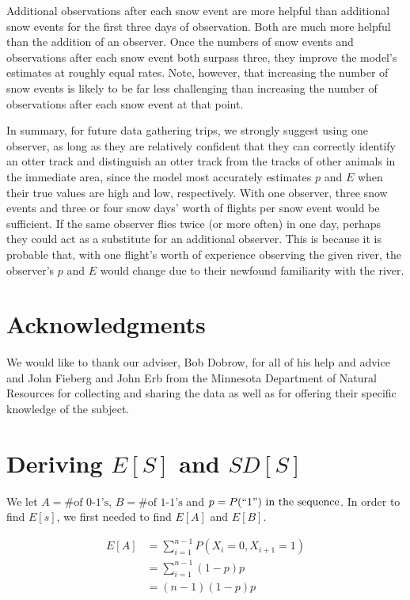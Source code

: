 \documentclass[12pt]{article}
\begin{document}
    Additional observations after each snow event are more helpful than
    additional snow events for the first three days of observation.
    Both are much more helpful than the addition of an observer.
    Once the numbers of snow events and observations after each snow event both
    surpass three, they improve the model's estimates at roughly equal rates.
    Note, however, that increasing the number of snow events is likely to be far
    less challenging than increasing the number of observations after each snow
    event at that point.

    In summary, for future data gathering trips, we strongly suggest using one
    observer, as long as they are relatively confident that they can correctly
    identify an otter track and distinguish an otter track from the tracks of
    other animals in the immediate area, since the model most accurately
    estimates \(p\) and \(E\) when their true values are high and low,
    respectively. With one observer, three snow events and three or four snow
    days' worth of flights per snow event would be sufficient. If the same
    observer flies twice (or more often) in one day, perhaps they could act as a
    substitute for an additional observer. This is because it is probable that,
    with one flight's worth of experience observing the given river, the
    observer's \(p\) and \(E\) would change due to their newfound familiarity
    with the river.

\section{Acknowledgments}
We would like to thank our adviser, Bob Dobrow, for all of his help and advice 
and John Fieberg and John Erb from the Minnesota Department of Natural Resources
for collecting and sharing the data as well as for offering their specific
knowledge of the subject.




\appendix
\section{Deriving \(E[S]\) and \(SD[S]\)}
\label{math}
    We let \(A = \text{\# of
    0-1's}\), \(B=\text{\# of 1-1's}\) and \(p=P(``1")\text{ in the sequence}\).
    In order to find \(E[s]\), we first needed to find \(E[A]\) and
    \(E[B]\).

    \begin{equation*}
        \begin{split}
        E[A]& =\sum_{i=1}^{n-1}P(X_i=0,X_{i+1}=1) \\
            & =\sum_{i=1}^{n-1}(1-p)p \\
            & =(n-1)(1-p)p \\
        \end{split}
    \end{equation*}
\end{document}
